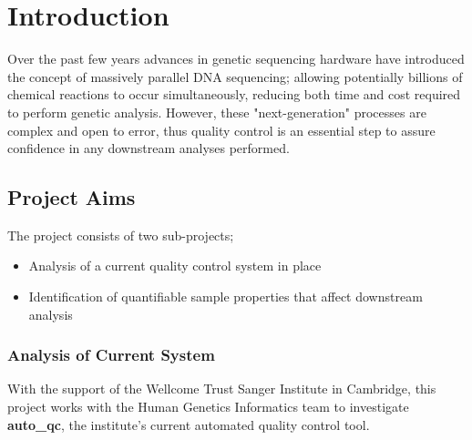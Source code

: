 \chapter{Introduction}
\ifpdf
    \graphicspath{{Chapter1/Figs/Raster/}{Chapter1/Figs/PDF/}{Chapter1/Figs/}}
\else
    \graphicspath{{Chapter1/Figs/Vector/}{Chapter1/Figs/}}
\fi


Over the past few years advances in genetic sequencing hardware have introduced
the concept of massively parallel DNA sequencing; allowing potentially billions
of chemical reactions to occur simultaneously, reducing both time and cost
required to perform genetic analysis\citep{HMG}. However, these
"next-generation" processes are complex and open to error\citep{Illumina}, thus
quality control is an essential step to assure confidence in any downstream
analyses performed.

\section{Project Aims}

The project consists of two sub-projects;

\begin{itemize}
    \item Analysis of a current quality control system in place
    \item Identification of quantifiable sample properties that affect downstream analysis
\end{itemize}


\subsection{Analysis of Current System}
With the support of the Wellcome Trust Sanger Institute in Cambridge, this
project works with the Human Genetics Informatics team to investigate
\textbf{auto\_qc}\citep{github:autoqc}, the institute's current automated quality control tool.

